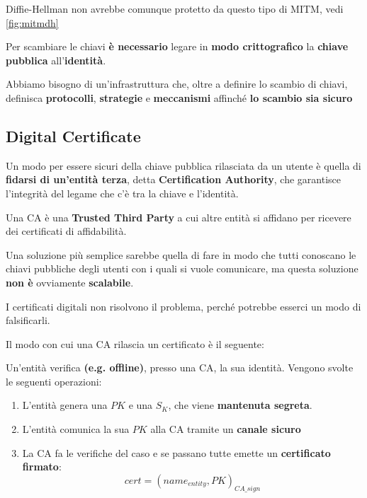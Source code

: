 \begin{remark}
Diffie-Hellman non avrebbe comunque protetto da questo tipo di MITM, vedi \cref{fig:mitmdh}
\end{remark}
\begin{proposition}
Per scambiare le chiavi \textbf{è necessario} legare in \textbf{modo crittografico} la \textbf{chiave pubblica} all'\textbf{identità}.
\end{proposition}
Abbiamo bisogno di un'infrastruttura che, oltre a definire lo scambio di chiavi, definisca \textbf{protocolli}, \textbf{strategie} e \textbf{meccanismi} affinché \textbf{lo scambio sia sicuro}
\subsection{Digital Certificate}\label{sssec:digitalcert}
Un modo per essere sicuri della chiave pubblica rilasciata da un utente è quella di \textbf{fidarsi di un'entità terza}, detta \textbf{Certification Authority}, che garantisce l'integrità del legame che c'è tra la chiave e l'identità.
\begin{definition}\label{def:ca}
Una CA è una \textbf{Trusted Third Party} a cui altre entità si affidano per ricevere dei certificati di affidabilità.
\end{definition}
\begin{remark}
Una soluzione più semplice sarebbe quella di fare in modo che tutti conoscano le chiavi pubbliche degli utenti con i quali si vuole comunicare, ma questa soluzione \textbf{non è} ovviamente \textbf{scalabile}.
\end{remark}
\begin{remark}
I certificati digitali non risolvono il problema, perché potrebbe esserci un modo di falsificarli.
\end{remark}
Il modo con cui una CA rilascia un certificato è il seguente:
\begin{proposition}
Un'entità verifica \textbf{(e.g. offline)}, presso una CA, la sua identità. Vengono svolte le seguenti operazioni:
\begin{enumerate}
    \item L'entità genera una $PK$ e una $S_K$, che viene \textbf{mantenuta segreta}.
    \item L'entità comunica la sua $PK$ alla CA tramite un \textbf{canale sicuro}
    \item La CA fa le verifiche del caso e se passano tutte emette un \textbf{certificato firmato}:
    \[cert=(name_{entity}, PK)_{CA\_sign}\]
\end{enumerate}
\end{proposition}

